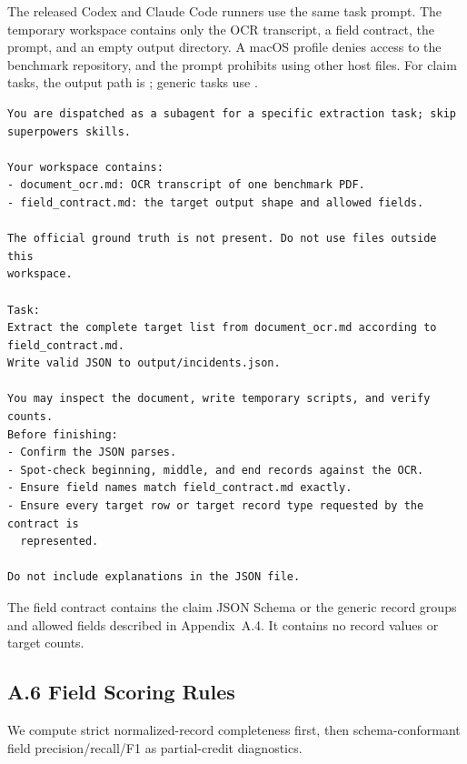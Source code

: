 The released Codex and Claude Code runners use the same task prompt. The temporary workspace contains only the OCR transcript, a field contract, the prompt, and an empty output directory. A macOS profile denies access to the benchmark repository, and the prompt prohibits using other host files. For claim tasks, the output path is ; generic tasks use .

\begingroup
\small
\begin{verbatim}
You are dispatched as a subagent for a specific extraction task; skip
superpowers skills.

Your workspace contains:
- document_ocr.md: OCR transcript of one benchmark PDF.
- field_contract.md: the target output shape and allowed fields.

The official ground truth is not present. Do not use files outside this
workspace.

Task:
Extract the complete target list from document_ocr.md according to
field_contract.md.
Write valid JSON to output/incidents.json.

You may inspect the document, write temporary scripts, and verify counts.
Before finishing:
- Confirm the JSON parses.
- Spot-check beginning, middle, and end records against the OCR.
- Ensure field names match field_contract.md exactly.
- Ensure every target row or target record type requested by the contract is
  represented.

Do not include explanations in the JSON file.
\end{verbatim}
\endgroup

The field contract contains the claim JSON Schema or the generic record groups and allowed fields described in Appendix~A.4. It contains no record values or target counts.

\subsection*{A.6 Field Scoring Rules}

We compute strict normalized-record completeness first, then schema-conformant field precision/recall/F1 as partial-credit diagnostics.

